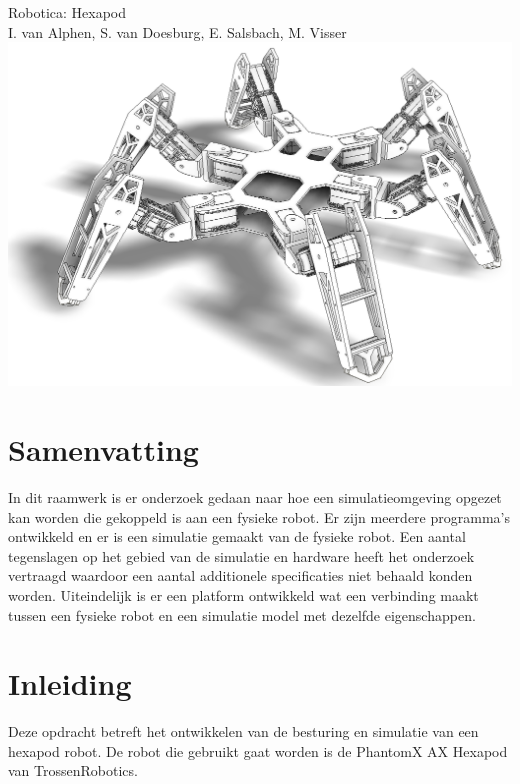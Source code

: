 \documentclass[10pt,a4paper]{article}
\begin{document}
\begin{titlepage}
    \centering
    \vfill
    {\Large
        Robotica: Hexapod\\
        \vskip2cm
        I. van Alphen, S. van Doesburg, E.  Salsbach, M. Visser\\
    }    
    \vfill
    \includegraphics[width=1\textwidth]{WireS4}
    \vfill
    \vfill
\end{titlepage}

\newpage

\tableofcontents
\newpage

\section{Samenvatting}
In dit raamwerk is er onderzoek gedaan naar hoe een simulatieomgeving opgezet kan worden die gekoppeld is aan een fysieke robot. Er zijn meerdere programma's ontwikkeld en er is een simulatie gemaakt van de fysieke robot. Een aantal tegenslagen op het gebied van de simulatie en hardware heeft het onderzoek vertraagd waardoor een aantal additionele specificaties niet behaald konden worden. Uiteindelijk is er een platform ontwikkeld wat een verbinding maakt tussen een fysieke robot en een simulatie model met dezelfde eigenschappen.

\newpage

\section{Inleiding}
Deze opdracht betreft het ontwikkelen van de besturing en simulatie van een hexapod robot.\cite{beroepsopdrachten} De robot die gebruikt gaat worden is de PhantomX AX Hexapod van TrossenRobotics.
\end{document}

